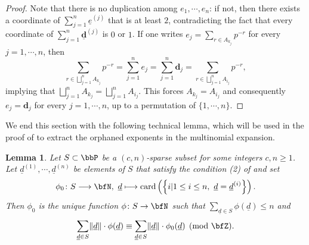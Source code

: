 \documentclass[english,oneside]{smfart}
\newcommand{\opn}[1]{\operatorname{#1}}
\newcommand{\lto}{\longrightarrow}
\newcommand{\uld}{\underline{d}}
\newcommand{\normd}{\lVert\uld\rVert}
\newtheorem{lemma}[theorem]{Lemma}
\begin{document}
\begin{proof}
    Note that there is no duplication among $e_1,\cdots,e_n$: if not, then there exists a coordinate of $\sum_{j=1}^n \underline{e}^{(j)}$ that is at least $2$, contradicting the fact that every coordinate of $\sum_{j=1}^n \underline{\mathbf{d}}^{(j)}$ is $0$ or $1$. If one writes $e_j=\sum_{r\in A_{k_j}}p^{-r}$ for every $j=1,\cdots,n$, then
    $$\sum_{r\in\bigsqcup_{j=1}^n A_{k_j}}p^{-r}=\sum_{j=1}^n e_j=\sum_{j=1}^n \mathbf{d}_j=\sum_{r\in\bigsqcup_{j=1}^n A_{i_j}}p^{-r},$$
    implying that $\bigsqcup_{j=1}^n A_{k_j}=\bigsqcup_{j=1}^n A_{i_j}$. This forces $A_{k_j}=A_{i_j}$ and consequently $e_j=\mathbf{d}_j$ for every $j=1,\cdots,n$, up to a permutation of $\{1,\cdots,n\}$.
\end{proof}

We end this section with the following technical lemma, which will be used in the proof of  to extract the orphaned exponents in the multinomial expansion.
\begin{lemma}\label{lem:39609}
    Let $S\subset\bbP$ be a $(c,n)$-sparse subset for some integers $c, n\geq 1$. Let $\underline{d}^{(1)},\cdots,\underline{d}^{(n)}$ be elements of $S$ that satisfy the condition (2) of  and set
    $$\phi_0\colon S\lto\bfN,\ \underline{d}\longmapsto \opn{card}\left(\left\{i\vert 1\leq i\leq n,\ \uld=\uld^{(i)}\right\}\right).$$
    Then $\phi_0$ is the unique function $\phi\colon S\to\bfN$ such that $\sum_{\uld\in S}\phi(\uld)\leq n$ and
    $$\sum_{\uld\in S}\normd\cdot\phi(\uld)\equiv \sum_{\uld\in S}\normd\cdot\phi_0(\uld)\pmod{\bfZ}.$$
\end{lemma}
\end{document}
